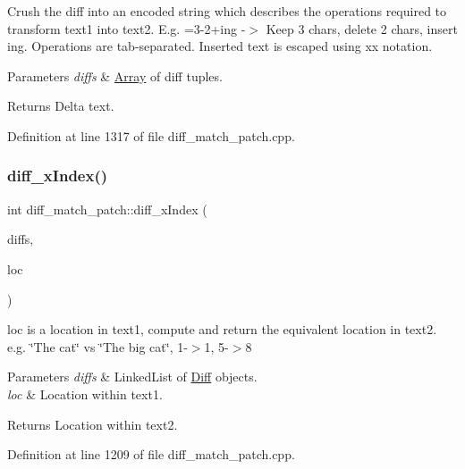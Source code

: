 Crush the diff into an encoded string which describes the operations required to transform text1 into text2. E.\+g. =3-\/2+ing -\/$>$ Keep 3 chars, delete 2 chars, insert \textquotesingle{}ing\textquotesingle{}. Operations are tab-\/separated. Inserted text is escaped using xx notation. 
\begin{DoxyParams}{Parameters}
{\em diffs} & \hyperlink{class_array}{Array} of diff tuples. \\
\hline
\end{DoxyParams}
\begin{DoxyReturn}{Returns}
Delta text. 
\end{DoxyReturn}


Definition at line 1317 of file diff\+\_\+match\+\_\+patch.\+cpp.

\mbox{\label{classdiff__match__patch_a91474da17c89bab2ca34efa207fe85b4}} 
\subsubsection{\texorpdfstring{diff\+\_\+x\+Index()}{diff\_xIndex()}}
{\footnotesize\ttfamily int diff\+\_\+match\+\_\+patch\+::diff\+\_\+x\+Index (\begin{DoxyParamCaption}\item[{const Q\+List$<$ \hyperlink{class_diff}{Diff} $>$ \&}]{diffs,  }\item[{int}]{loc }\end{DoxyParamCaption})}

loc is a location in text1, compute and return the equivalent location in text2. e.\+g. \char`\"{}\+The cat\char`\"{} vs \char`\"{}\+The big cat\char`\"{}, 1-\/$>$1, 5-\/$>$8 
\begin{DoxyParams}{Parameters}
{\em diffs} & Linked\+List of \hyperlink{class_diff}{Diff} objects. \\
\hline
{\em loc} & Location within text1. \\
\hline
\end{DoxyParams}
\begin{DoxyReturn}{Returns}
Location within text2. 
\end{DoxyReturn}


Definition at line 1209 of file diff\+\_\+match\+\_\+patch.\+cpp.


